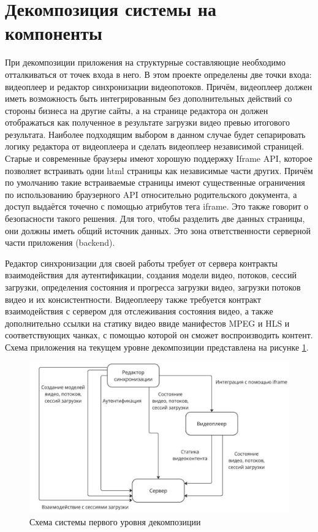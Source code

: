 \section{Декомпозиция системы на компоненты} \label{ch2:decomposition}

	При декомпозиции приложения на структурные составляющие необходимо отталкиваться от точек входа в него. В этом проекте определены две точки входа: видеоплеер и редактор синхронизации видеопотоков. Причём, видеоплеер должен иметь возможность быть интегрированным без дополнительных действий со стороны бизнеса на другие сайты, а на странице редактора он должен отображаться как полученное в результате загрузки видео превью итогового результата. Наиболее подходящим выбором в данном случае будет сепарировать логику редактора от видеоплеера и сделать видеоплеер независимой страницей. Старые и современные браузеры имеют хорошую поддержку Iframe API, которое позволяет встраивать одни html страницы как независимые части других. Причём по умолчанию такие встраиваемые страницы имеют существенные ограничения по использованию браузерного API относительно родительского документа, а доступ выдаётся точечно с помощью атрибутов тега iframe. Это также говорит о безопасности такого решения. Для того, чтобы разделить две данных страницы, они должны иметь общий источник данных. Это зона ответственности серверной части приложения (backend).

	Редактор синхронизации для своей работы требует от сервера контракты взаимодействия для аутентификации, создания модели видео, потоков, сессий загрузки, определения состояния и прогресса загрузки видео, загрузки потоков видео и их консистентности. Видеоплееру также требуется контракт взаимодействия с сервером для отслеживания состояния видео, а также дополнительно ссылки на статику видео ввиде манифестов MPEG и HLS и соответствующих чанках, с помощью которой он сможет воспроизводить контент. Схема приложения на текущем уровне декомпозиции представлена на рисунке \ref{fig:system_scheme_1}.

	\begin{figure}[ht!] 
		\center
		\includegraphics [scale=0.37] {my_folder/images//system_scheme_1}
		\caption{Схема системы первого уровня декомпозиции} 
		\label{fig:system_scheme_1}  
	\end{figure}

